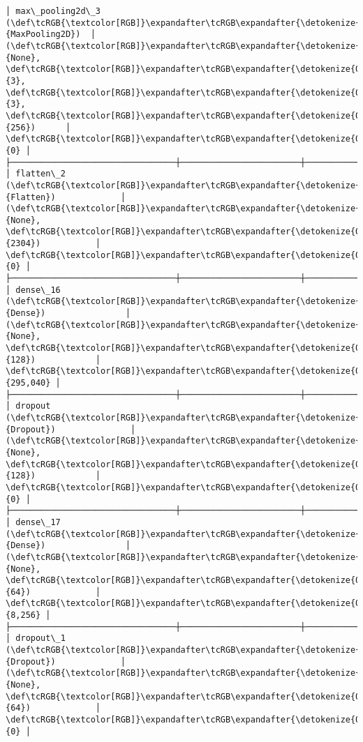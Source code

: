 \documentclass[12pt letter]{report}
\begin{document}
\begin{Verbatim}[commandchars=\\\{\}]
│ max\_pooling2d\_3 (\def\tcRGB{\textcolor[RGB]}\expandafter\tcRGB\expandafter{\detokenize{0,135,255}}{MaxPooling2D})  │ (\def\tcRGB{\textcolor[RGB]}\expandafter\tcRGB\expandafter{\detokenize{0,215,255}}{None}, \def\tcRGB{\textcolor[RGB]}\expandafter\tcRGB\expandafter{\detokenize{0,175,0}}{3}, \def\tcRGB{\textcolor[RGB]}\expandafter\tcRGB\expandafter{\detokenize{0,175,0}}{3}, \def\tcRGB{\textcolor[RGB]}\expandafter\tcRGB\expandafter{\detokenize{0,175,0}}{256})      │             \def\tcRGB{\textcolor[RGB]}\expandafter\tcRGB\expandafter{\detokenize{0,175,0}}{0} │
├─────────────────────────────────┼────────────────────────┼───────────────┤
│ flatten\_2 (\def\tcRGB{\textcolor[RGB]}\expandafter\tcRGB\expandafter{\detokenize{0,135,255}}{Flatten})             │ (\def\tcRGB{\textcolor[RGB]}\expandafter\tcRGB\expandafter{\detokenize{0,215,255}}{None}, \def\tcRGB{\textcolor[RGB]}\expandafter\tcRGB\expandafter{\detokenize{0,175,0}}{2304})           │             \def\tcRGB{\textcolor[RGB]}\expandafter\tcRGB\expandafter{\detokenize{0,175,0}}{0} │
├─────────────────────────────────┼────────────────────────┼───────────────┤
│ dense\_16 (\def\tcRGB{\textcolor[RGB]}\expandafter\tcRGB\expandafter{\detokenize{0,135,255}}{Dense})                │ (\def\tcRGB{\textcolor[RGB]}\expandafter\tcRGB\expandafter{\detokenize{0,215,255}}{None}, \def\tcRGB{\textcolor[RGB]}\expandafter\tcRGB\expandafter{\detokenize{0,175,0}}{128})            │       \def\tcRGB{\textcolor[RGB]}\expandafter\tcRGB\expandafter{\detokenize{0,175,0}}{295,040} │
├─────────────────────────────────┼────────────────────────┼───────────────┤
│ dropout (\def\tcRGB{\textcolor[RGB]}\expandafter\tcRGB\expandafter{\detokenize{0,135,255}}{Dropout})               │ (\def\tcRGB{\textcolor[RGB]}\expandafter\tcRGB\expandafter{\detokenize{0,215,255}}{None}, \def\tcRGB{\textcolor[RGB]}\expandafter\tcRGB\expandafter{\detokenize{0,175,0}}{128})            │             \def\tcRGB{\textcolor[RGB]}\expandafter\tcRGB\expandafter{\detokenize{0,175,0}}{0} │
├─────────────────────────────────┼────────────────────────┼───────────────┤
│ dense\_17 (\def\tcRGB{\textcolor[RGB]}\expandafter\tcRGB\expandafter{\detokenize{0,135,255}}{Dense})                │ (\def\tcRGB{\textcolor[RGB]}\expandafter\tcRGB\expandafter{\detokenize{0,215,255}}{None}, \def\tcRGB{\textcolor[RGB]}\expandafter\tcRGB\expandafter{\detokenize{0,175,0}}{64})             │         \def\tcRGB{\textcolor[RGB]}\expandafter\tcRGB\expandafter{\detokenize{0,175,0}}{8,256} │
├─────────────────────────────────┼────────────────────────┼───────────────┤
│ dropout\_1 (\def\tcRGB{\textcolor[RGB]}\expandafter\tcRGB\expandafter{\detokenize{0,135,255}}{Dropout})             │ (\def\tcRGB{\textcolor[RGB]}\expandafter\tcRGB\expandafter{\detokenize{0,215,255}}{None}, \def\tcRGB{\textcolor[RGB]}\expandafter\tcRGB\expandafter{\detokenize{0,175,0}}{64})             │             \def\tcRGB{\textcolor[RGB]}\expandafter\tcRGB\expandafter{\detokenize{0,175,0}}{0} │

\end{Verbatim}
\end{document}
